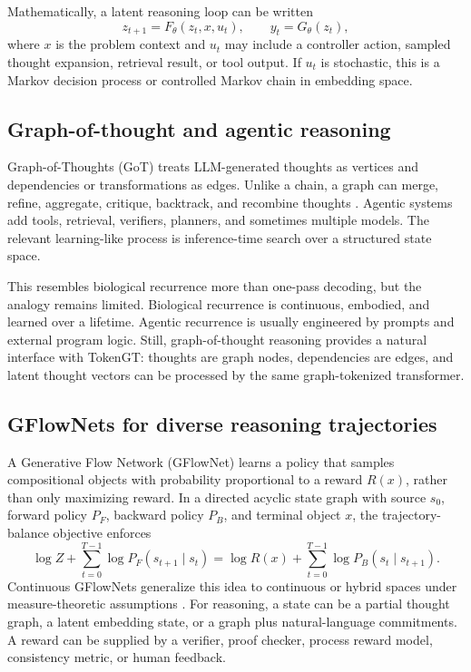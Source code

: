 \documentclass[11pt]{article}
\newcommand{\1}{\mathbf{1}}
\begin{document}
Mathematically, a latent reasoning loop can be written
\[
z_{t+1}=F_\theta(z_t,x,u_t),\qquad y_t=G_\theta(z_t),
\]
where $x$ is the problem context and $u_t$ may include a controller action, sampled thought expansion, retrieval result, or tool output. If $u_t$ is stochastic, this is a Markov decision process or controlled Markov chain in embedding space.

\subsection{Graph-of-thought and agentic reasoning}

Graph-of-Thoughts (GoT) treats LLM-generated thoughts as vertices and dependencies or transformations as edges. Unlike a chain, a graph can merge, refine, aggregate, critique, backtrack, and recombine thoughts \cite{BestaGoT2023,GraphThoughtsSurvey2024}. Agentic systems add tools, retrieval, verifiers, planners, and sometimes multiple models. The relevant learning-like process is inference-time search over a structured state space.

This resembles biological recurrence more than one-pass decoding, but the analogy remains limited. Biological recurrence is continuous, embodied, and learned over a lifetime. Agentic recurrence is usually engineered by prompts and external program logic. Still, graph-of-thought reasoning provides a natural interface with TokenGT: thoughts are graph nodes, dependencies are edges, and latent thought vectors can be processed by the same graph-tokenized transformer.

\subsection{GFlowNets for diverse reasoning trajectories}

A Generative Flow Network (GFlowNet) learns a policy that samples compositional objects with probability proportional to a reward $R(x)$, rather than only maximizing reward. In a directed acyclic state graph with source $s_0$, forward policy $P_F$, backward policy $P_B$, and terminal object $x$, the trajectory-balance objective enforces
\[
\log Z + \sum_{t=0}^{T-1}\log P_F(s_{t+1}\mid s_t)
=\log R(x)+\sum_{t=0}^{T-1}\log P_B(s_t\mid s_{t+1}).
\]
Continuous GFlowNets generalize this idea to continuous or hybrid spaces under measure-theoretic assumptions \cite{BengioGFlowNet2021,Lahlou2023,Brunswic2023,Younsi2025}. For reasoning, a state can be a partial thought graph, a latent embedding state, or a graph plus natural-language commitments. A reward can be supplied by a verifier, proof checker, process reward model, consistency metric, or human feedback.
\end{document}
